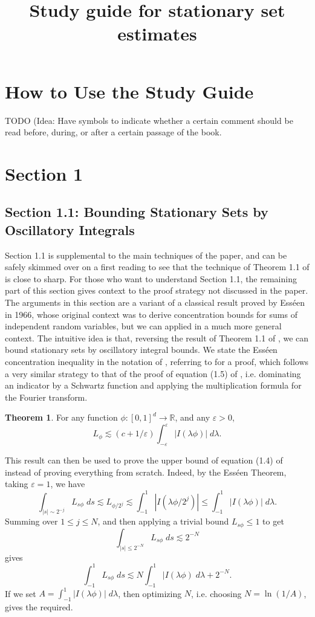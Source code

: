 \documentclass[12pt]{article}
\title{Study guide for stationary set estimates}
\newcommand{\R}{\mathbb{R}}
\theoremstyle{definition}
\newtheorem{theorem}{Theorem}[section]
\theoremstyle{remark}
\numberwithin{equation}{section}
\begin{document}
\maketitle

\section{How to Use the Study Guide}

TODO (Idea: Have symbols to indicate whether a certain comment should be read before, during, or after a certain passage of the book.

\section{Section 1}

\subsection*{Section 1.1: Bounding Stationary Sets by Oscillatory Integrals}

Section 1.1 is supplemental to the main techniques of the paper, and can be safely skimmed over on a first reading to see that the technique of Theorem 1.1 of \cite{BGZZ} is close to sharp. For those who want to understand Section 1.1, the remaining part of this section gives  context to the proof strategy not discussed in the paper. The arguments in this section are a variant of a classical result \cite{Esseen} proved by Ess\'{e}en in 1966, whose original context was to derive concentration bounds for sums of independent random variables, but we can applied in a much more general context. The intuitive idea is that, reversing the result of Theorem 1.1 of \cite{BGZZ}, we can bound stationary sets by oscillatory integral bounds. We state the Ess\'{e}en concentration inequality in the notation of \cite{BGZZ}, referring to \cite{TaoVu} for a proof, which follows a very similar strategy to that of the proof of equation (1.5) of \cite{BGZZ}, i.e. dominating an indicator by a Schwartz function and applying the multiplication formula for the Fourier transform.

\begin{theorem}
    For any function $\phi: [0,1]^d \to \R$, and any $\varepsilon > 0$,
    \[ L_\phi \lesssim (c + 1/\varepsilon) \int_{-\varepsilon}^\varepsilon |I(\lambda \phi)|\; d\lambda. \]
\end{theorem}

This result can then be used to prove the upper bound of equation (1.4) of \cite{BGZZ} instead of proving everything from scratch. Indeed, by the Ess\'{e}en Theorem, taking $\varepsilon = 1$, we have
%
\[ \int_{|s| \sim 2^{-j}} L_{s \phi}\; ds \lesssim L_{\phi / 2^j} \lesssim \int_{-1}^1 |I(\lambda \phi / 2^j)| \leq \int_{-1}^1 |I(\lambda \phi)|\; d\lambda. \]
%
Summing over $1 \leq j \leq N$, and then applying a trivial bound $L_{s \phi} \leq 1$ to get
%
\[ \int_{|s| \leq 2^{-N}} L_{s \phi}\; ds \lesssim 2^{-N} \]
%
gives
%
\[ \int_{-1}^1 L_{s \phi}\; ds \lesssim N \int_{-1}^1 |I(\lambda \phi)\; d\lambda + 2^{-N}. \]
If we set $A = \int_{-1}^1 |I(\lambda \phi)|\; d\lambda$, then optimizing $N$, i.e. choosing $N = \ln(1/A)$, gives the required.
\end{document}
